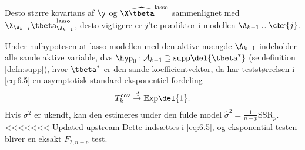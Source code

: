 Desto større kovarians af \(\y\) og \(\X \widehat{\tbeta}^\text{lasso}\) sammenlignet med \(\X_{\A_{k-1}} \tilde{\tbeta}^\text{lasso}_{\A_{k-1}}\), desto vigtigere er \(j\)'te prædiktor i modellen \(\A_{k-1} \cup \cbr{j}\).

Under nulhypotesen at lasso modellen med den aktive mængde \(\A_{k-1}\) indeholder alle sande aktive variable, dvs \(\hyp_0: \mathcal{A}_{k-1} \supseteq \text{supp} \del{\tbeta^*}\) (se definition \ref{defn:supp}), hvor \(\tbeta^*\) er den sande koefficientvektor, da har teststørrelsen i \eqref{eq:6.5} en asymptotisk standard eksponentiel fordeling
\begin{align*}
T_k^\text{cov} \overset{d}{\rightarrow} \text{Exp}\del{1}.
\end{align*}
Hvis \(\sigma^2\) er ukendt, kan den estimeres under den fulde model \(\widehat{\sigma}^2 = \frac{1}{n-p} \text{SSR}_p\). 
<<<<<<< Updated upstream
Dette indsættes i \eqref{eq:6.5}, og eksponential testen bliver en eksakt \(F_{2,n-p}\) test. \\
%
